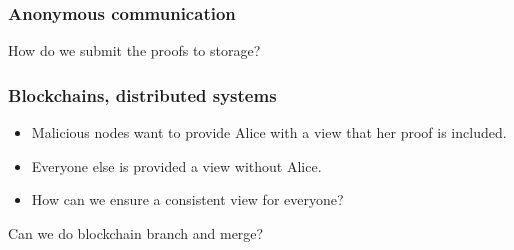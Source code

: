 \begin{frame}
  \frametitle{Anonymous communication}
  \begin{question}
    How do we submit the proofs to storage?
  \end{question}

\end{frame}

\begin{frame}
  \frametitle{Blockchains, distributed systems}
  \begin{question}
    \begin{itemize}
      \item Malicious nodes want to provide Alice with a view that her proof is 
        included.
      \item Everyone else is provided a view without Alice.
      \item How can we ensure a consistent view for everyone?
    \end{itemize}
  \end{question}

  \begin{question}
    Can we do blockchain branch and merge?
  \end{question}
\end{frame}


